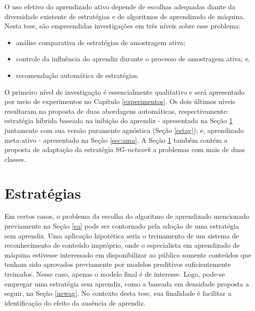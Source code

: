 O uso efetivo do aprendizado ativo depende de escolhas adequadas diante da diversidade existente de estratégias e de algoritmos de aprendizado de máquina.
Nesta tese, são empreendidas investigações em três níveis sobre esse problema:

\begin{itemize}
\item análise comparativa de estratégias de amostragem ativa;
\item controle da influência do aprendiz durante o processo de amostragem ativa; e,
\item recomendação automática de estratégias.
\end{itemize}

O primeiro nível de investigação é essencialmente qualitativo e será apresentado por meio de experimentos no Capítulo \ref{experimentos}.
Os dois últimos níveis resultaram na proposta de duas abordagens automáticas, 
respectivamente:  
 estratégia híbrida baseada na inibição do aprendiz
- apresentada na Seção \ref{newstrats} juntamente com sua versão puramente agnóstica (Seção \ref{estag}); e, aprendizado meta-ativo - apresentado na Seção \ref{sec:ama}.
A Seção \ref{newstrats} também contém a proposta de adaptação da estratégia SG-\textit{network} a problemas com mais de duas classes.

\section{Estratégias}\label{newstrats}
Em certos casos, o problema da escolha do algoritmo de aprendizado mencionado previamente na Seção \ref{ea} pode ser contornado pela adoção de uma estratégia sem aprendiz.
Uma aplicação hipotética seria o treinamento de um sistema de reconhecimento de conteúdo impróprio, onde o especialista em aprendizado de máquina estivesse interessado em disponibilizar ao público somente conteúdos que tenham sido aprovados previamente por modelos preditivos suficientemente treinados.
Nesse caso, apenas o modelo final é de interesse.
Logo, pode-se empregar uma estratégia sem aprendiz, como a baseada em densidade proposta a seguir, na Seção \ref{newag}.
No contexto desta tese, sua finalidade é facilitar a identificação do efeito da ausência de aprendiz.

